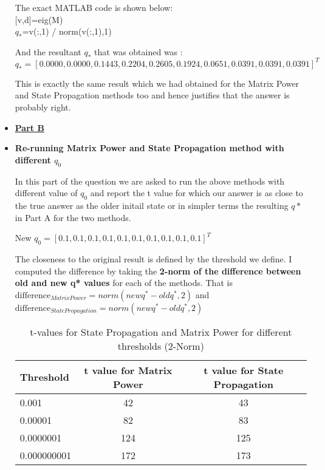 \documentclass[11pt]{article}
\begin{document}
\begin{itemize}
	The exact MATLAB code is shown below:\\
	
	[v,d]=eig(M) \\
	$q_*$=v(:,1) / norm(v(:,1),1)
	
	And the resultant $q_*$ that was obtained was :\\
	
	 $\boxed{q_*= [0.0000,
	 0.0000,
	 0.1443,
	 0.2204,
	 0.2605,
	 0.1924,
	 0.0651,
	 0.0391,
	 0.0391,
	 0.0391]^T}$
	
	This is exactly the same result which we had obtained for the Matrix Power and State Propagation methods too and hence justifies that the answer is probably right.



\item[] \textbf{\underline{Part B}}

\item[] \textbf{Re-running Matrix Power and State Propagation method with different $q_0$}

In this part of the question we are asked to run the above methods with different value of $q_0$ and report the t value for which our answer is as close to the true answer as the older initail state or in simpler terms the resulting $q*$ in Part A for the two methods.

New $q_0=[0.1, 0.1, 0.1, 0.1, 0.1, 0.1, 0.1, 0.1, 0.1, 0.1]^T$

The closeness to the original result is defined by the threshold we define. I computed the difference by taking the \textbf{2-norm of the  difference between old and new q* values} for each of the methods. That is \\
$\text{difference}_{MatrixPower} =norm(new q^* -old  q^*,2)$ and\\ $\text{difference}_{StatePropagation} =norm(new q^* -old q^*,2)$  

\begin{table}[h]
	\centering
	\begin{tabular}{|l|c|c|}
		\hline
		\textbf{Threshold}  & \textbf{t value for Matrix Power} & \textbf{t value for State Propagation}\\
		\hline
		0.001 &  42 & 43 \\
		\hline
		0.00001&  82 & 83\\
		\hline
		0.0000001 &  124  & 125\\
		\hline
		0.000000001 & 172  & 173 \\
		\hline
	\end{tabular}
	\caption{t-values for State Propagation and Matrix Power for different thresholds (2-Norm)}
	\label{t2}
\end{table}


\end{itemize}
\end{document}

